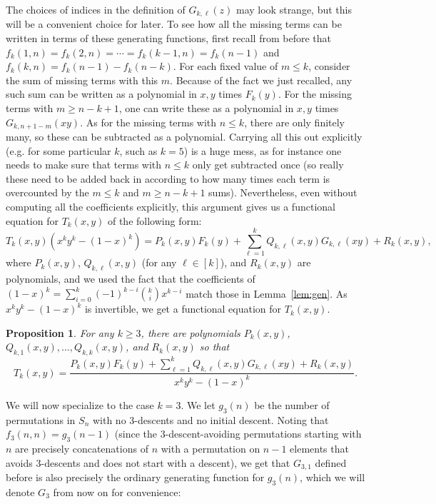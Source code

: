 \documentclass{amsart}
\newtheorem{proposition}[theorem]{Proposition}
\theoremstyle{definition}
\begin{document}
The choices of indices in the definition of $G_{k,\ell}(z)$ may look strange, but this will be a convenient choice for later. To see how all the missing terms can be written in terms of these generating functions, first recall from before that $f_k(1,n)=f_k(2,n)=\cdots=f_k(k-1,n)=f_k(n-1)$ and $f_k(k,n)=f_k(n-1)-f_k(n-k)$. For each fixed value of $m\leq k$, consider the sum of missing terms with this $m$. Because of the fact we just recalled, any such sum can be written as a polynomial in $x,y$ times $F_k(y)$. For the missing terms with $m\geq n-k+1$, one can write these as a polynomial in $x,y$ times $G_{k,n+1-m}(xy)$. As for the missing terms with $n\leq k$, there are only finitely many, so these can be subtracted as a polynomial. Carrying all this out explicitly (e.g. for some particular $k$, such as $k=5$) is a huge mess, as for instance one needs to make sure that terms with $n\leq k$ only get subtracted once (so really these need to be added back in according to how many times each term is overcounted by the $m\leq k$ and $m\geq n-k+1$ sums). Nevertheless, even without computing all the coefficients explicitly, this argument gives us a functional equation for $T_k(x,y)$ of the following form:
\[T_k(x,y)\left(x^k y^k -(1-x)^k\right)=P_k(x,y)F_k(y)+\sum_{\ell=1}^k Q_{k,\ell}(x,y)G_{k,\ell}(xy)+R_k(x,y),\]
where $P_k(x,y)$, $Q_{k,\ell}(x,y)$ (for any $\ell\in [k]$), and $R_k(x,y)$ are polynomials, and we used the fact that the coefficients of $(1-x)^k=\sum_{i=0}^k (-1)^{k-i}\binom{k}{i}x^{k-i}$ match those in Lemma~\ref{lem:gen}. As $x^k y^k -(1-x)^k$ is invertible, we get a functional equation for $T_k(x,y)$.

\begin{proposition}\label{prop:genf}
For any $k\geq 3$, there are polynomials $P_k(x,y)$, $Q_{k,1}(x,y),\ldots, Q_{k,k}(x,y)$, and $R_k(x,y)$ so that
\[T_k(x,y)=\frac{P_k(x,y)F_k(y)+\sum_{\ell=1}^k Q_{k,\ell}(x,y)G_{k,\ell}(xy)+R_k(x,y)}{x^k y^k-(1-x)^k}.\]
\end{proposition}





We will now specialize to the case $k=3$. We let $g_3(n)$ be the number of permutations in $S_n$ with no $3$-descents and no initial descent. Noting that $f_3(n,n)=g_3(n-1)$ (since the $3$-descent-avoiding permutations starting with $n$ are precisely concatenations of $n$ with a permutation on $n-1$ elements that avoids $3$-descents and does not start with a descent), we get that $G_{3,1}$ defined before is also precisely the ordinary generating function for $g_3(n)$, which we will denote $G_3$ from now on for convenience:
\end{document}
